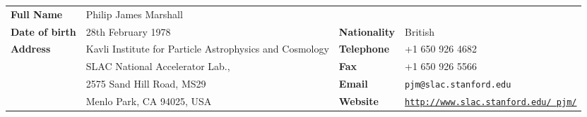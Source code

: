 \begin{raggedright}
\begin{tabular}{@{}p{2.3cm}p{6.0cm}p{2.0cm}p{5.2cm}}
\textbf{Full Name}      & Philip James Marshall           & & \\
\textbf{Date of birth}  & 28th February 1978              & \textbf{Nationality}  & British \\
\textbf{Address}        & Kavli Institute for Particle Astrophysics and Cosmology            & \textbf{Telephone} & +1 650 926 4682 \\
                        & SLAC National Accelerator Lab., & \textbf{Fax}       & +1 650 926 5566 \\
                        & 2575 Sand Hill Road, MS29       & \textbf{Email}     & \texttt{pjm@slac.stanford.edu} \\
                        & Menlo Park, CA 94025, USA       & \textbf{Website}   & \href{http://www.slac.stanford.edu/~pjm/}{\texttt{http://www.slac.stanford.edu/~pjm/}}
\end{tabular}
\end{raggedright}
